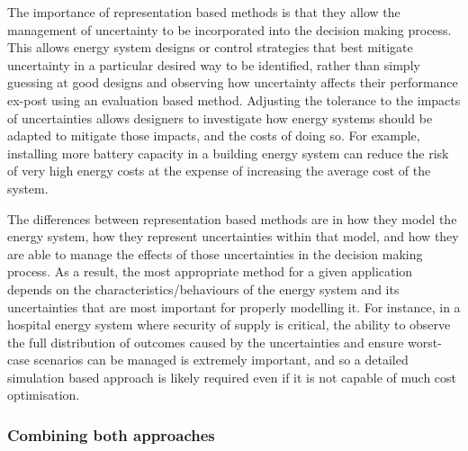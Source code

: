 
The importance of representation based methods is that they allow the management of uncertainty to be incorporated into the decision making process. This allows energy system designs or control strategies that best mitigate uncertainty in a particular desired way to be identified, rather than simply guessing at good designs and observing how uncertainty affects their performance ex-post using an evaluation based method. Adjusting the tolerance to the impacts of uncertainties allows designers to investigate how energy systems should be adapted to mitigate those impacts, and the costs of doing so. For example, installing more battery capacity in a building energy system can reduce the risk of very high energy costs at the expense of increasing the average cost of the system.

The differences between representation based methods are in how they model the energy system, how they represent uncertainties within that model, and how they are able to manage the effects of those uncertainties in the decision making process. As a result, the most appropriate method for a given application depends on the characteristics/behaviours of the energy system and its uncertainties that are most important for properly modelling it. For instance, in a hospital energy system where security of supply is critical, the ability to observe the full distribution of outcomes caused by the uncertainties and ensure worst-case scenarios can be managed is extremely important, and so a detailed simulation based approach is likely required even if it is not capable of much cost optimisation.



\subsubsection{Combining both approaches}

